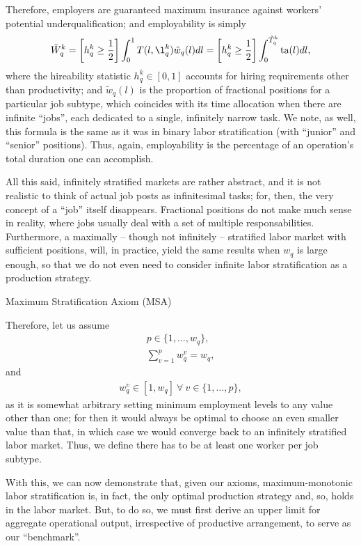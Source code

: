 \documentclass[hidelinks, nonatbib]{elsarticle}
\begin{document}
Therefore, employers are guaranteed maximum insurance against workers' potential underqualification; and employability is simply
\begin{gather}
\tilde{W}_{q}^{k} 
= 
\left[
    h_{q}^{k}
    \geq
    \frac{1}{2}
\right]
\int_{0}^{1}
T(l, \l_{q}^{k})
\tilde{w}_{q}(l)
dl
= 
\left[
    h_{q}^{k}
    \geq
    \frac{1}{2}
\right]
\int_{0}^{\tilde{T}_{q}^{k}}
\text{ta}(l)
dl
,
\end{gather}
where the hireability statistic $h_{q}^{k} \in [0,1]$ accounts for hiring requirements other than productivity; and $\tilde{w}_{q}(l)$ is the proportion of fractional positions for a particular job subtype, which coincides with its time allocation when there are infinite ``jobs'', each dedicated to a single, infinitely narrow task. We note, as well, this formula is the same as it was in binary labor stratification (with ``junior'' and ``senior'' positions). Thus, again, employability is the percentage of an operation's total duration one can accomplish.

All this said, infinitely stratified markets are rather abstract, and it is not realistic to think of actual job posts as infinitesimal tasks; for, then, the very concept of a ``job'' itself disappears. Fractional positions do not make much sense in reality, where jobs usually deal with a set of multiple responsabilities. Furthermore, a maximally -- though not infinitely -- stratified labor market with sufficient positions, will, in practice, yield the same results when $w_q$ is large enough, so that we do not even need to consider  infinite labor stratification as a production strategy.

Maximum Stratification Axiom (MSA)

Therefore, let us assume
\begin{gather}
p \in \{1, \dots, w_q\}
,
\\
\sum_{v=1}^{p}
w_{q}^{v}
=
w_q
,
\end{gather}
and
\begin{gather}
w_{q}^{v} 
\in 
[1, w_q]
\
\forall
\
v \in \{1, \dots, p\}
,
\end{gather}
as it is somewhat arbitrary setting minimum employment levels to any value other than one; for then it would always be optimal to choose an even smaller value than that, in which case we would converge back to an infinitely stratified labor market. Thus, we define there has to be at least one worker per job subtype.

With this, we can now demonstrate that, given our axioms, maximum-monotonic labor stratification is, in fact, the only optimal production strategy and, so, holds in the labor market. But, to do so, we must first derive an upper limit for aggregate operational output, irrespective of productive arrangement, to serve as our ``benchmark''.
\end{document}
